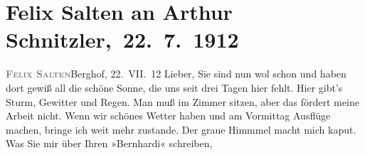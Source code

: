 

         
         \renewcommand{\erwaehntePersonen}{Personen: Lili Cappellini, Samuel Fischer, Hedwig Fischer, Karl Goldmark, Felix Salten, Olga Schnitzler, Heinrich Schnitzler}
         \renewcommand{\erwaehnteInstitutionen}{Institutionen: K. u. k. Zensurstelle}
         \renewcommand{\erwaehnteOrte}{Orte: Berghof, Brijuni, Unterach am Attersee}
         \renewcommand{\erwaehnteWerke}{Werke: Professor Bernhardi. Komödie in fünf Akten}
               \section[ Felix Salten an Arthur Schnitzler, 22. 7. 1912]{ Felix Salten an Arthur Schnitzler, 22. 7. 1912}\nopagebreak{}\rehead{ }\begin{ledgroupsized}[t]{13cm}\normalsize\beginnumbering{} \toendnotes[C]{\smallbreak\pagebreak[2]} 
\toendnotes[C]{\smallbreak}\pstart
           \noindent{}{\pb}\textcolor{gray}{\textbf{\textsc{Felix Salten}}}\hfill Berghof, 22. VII. 12\pend
           \pstart{}Lieber,\pend\pstart
           Sie sind nun wol schon \label{K_L03558-1v}\label{K_L03558-1h} und haben dort gewiß all die schöne Sonne, die uns seit drei Tagen hier fehlt. Hier gibt’s Sturm,
               Gewitter und Regen. Man muß im Zimmer sitzen, aber das fördert meine Arbeit nicht.
               Wenn wir schönes Wetter haben und am Vormittag Ausflüge machen, bringe ich weit mehr
               zustande. Der graue Himmmel macht mich kaput.\pend
           \pstart
           Was Sie mir über Ihren »Bernhardi« schreiben,

\end{ledgroupsized}
